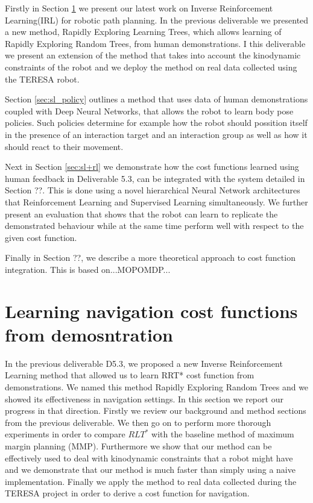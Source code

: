 \documentclass[a4paper,11pt]{report}
\begin{document}
Firstly in Section \ref{sec:rrt-iros} we present our latest work on Inverse Reinforcement Learning(IRL) for robotic path planning. In the previous deliverable we presented a new method, Rapidly Exploring Learning Trees, which allows learning of Rapidly Exploring Random Trees, from human demonstrations. I this deliverable we present an extension of the method that takes into account the kinodynamic constraints of the robot and we deploy the method on real data collected using the TERESA robot. 

Section \ref{sec:sl_policy} outlines a method that uses data of human demonstrations coupled with Deep Neural Networks, that allows the robot to learn body pose policies. Such policies determine for example how the robot should possition itself in the presence of an interaction target and an interaction group as well as how it should react to their movement.

Next in Section \ref{sec:sl+rl} we demonstrate how the cost functions learned using human feedback in Deliverable 5.3, can be integrated with the system detailed in Section ??. This is done using a novel hierarchical Neural Network architectures that Reinforcement Learning and Supervised Learning simultaneously. We further present an evaluation that shows that the robot can learn to replicate the demonstrated behaviour while at the same time perform well with respect to the given cost function.  

Finally in Section ??, we describe a more theoretical approach to cost function integration. This is based on...MOPOMDP...

\pagebreak


\section{Learning navigation cost functions from demosntration}
\label{sec:rrt-iros}

In the previous deliverable D5.3, we proposed a new Inverse Reinforcement Learning method that allowed us to learn RRT* cost function from demonstrations. We named this method Rapidly Exploring Random Trees and we showed its effectiveness in navigation settings. In this section we report our progress in that direction. Firstly we review our background and method sections from the previous deliverable. We then go on to perform more thorough experiments in order to compare $RLT^*$ with the baseline method of maximum margin planning (MMP). Furthermore we show that our method can be effectively used to deal with kinodynamic constraints that a robot might have and we demonstrate that our method is much faster than simply using a naive implementation. Finally we apply the method to real data collected during the TERESA project in order to derive a cost function for navigation.
\end{document}
